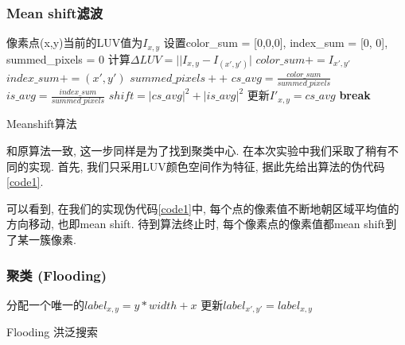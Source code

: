 \documentclass[a4paper, 11pt]{article}
\begin{document}
\subsubsection{Mean shift滤波 } 

\begin{algorithm}[H]
    \DontPrintSemicolon
    {
        {
            像素点(x,y)当前的LUV值为$I_{x,y}$\;
            设置color\_sum = [0,0,0], index\_sum = [0, 0], summed\_pixels = 0\;
            {
                计算$\Delta LUV=||I_{x,y}-I_(x',y')|$\;
                {
                    $color\_sum += I_{x',y'}$\;
                    $index\_sum += (x',y')$\;
                    $summed\_pixels++$\;
                }
                $cs\_avg=\frac{color\_sum}{summed\_pixels}$\;
                $is\_avg=\frac{index\_sum}{summed\_pixels}$\;
                $shift = |cs\_avg|^2 + |is\_avg|^2$ \;
                更新$I'_{x,y}=cs\_avg$\;
                {
                    \textbf{break}\;
                }
            }
        }
    }
\caption{Meanshift算法}
\label{code1}
\end{algorithm}

和原算法一致, 这一步同样是为了找到聚类中心. 在本次实验中我们采取了稍有不同的实现.
首先, 我们只采用LUV颜色空间作为特征, 据此先给出算法的伪代码\ref{code1}.

可以看到, 在我们的实现伪代码\ref{code1}中, 每个点的像素值不断地朝区域平均值的方向移动, 也即mean shift.
待到算法终止时, 每个像素点的像素值都mean shift到了某一簇像素.

\subsubsection{聚类 (Flooding)} 

\begin{algorithm}[H]
    \DontPrintSemicolon
    {
        分配一个唯一的$label_{x,y}=y*width+x$\;
        {
            {
                {
                    更新$label_{x',y'}=label_{x,y}$\;
                }
            }
        }
    }
\caption{Flooding 洪泛搜索}
\label{code2}
\end{algorithm}
\end{document}
